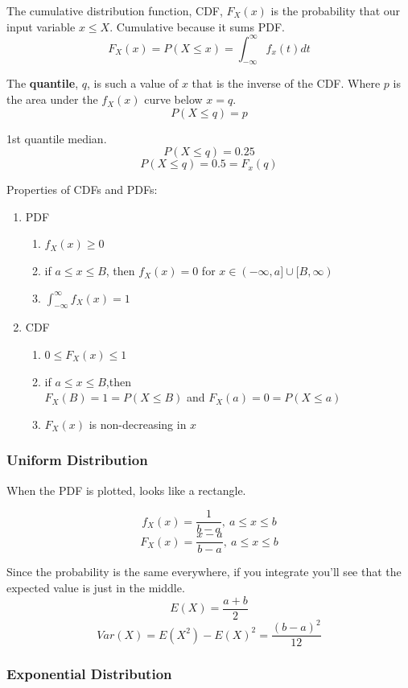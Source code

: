 \documentclass{report}
\begin{document}
The cumulative distribution function, CDF, $F_X(x)$ is the probability that our input variable $x \leq X$. Cumulative because it sums PDF. $$F_X(x) = P(X \leq x) = \int_{-\infty}^{\infty} f_x(t) dt$$

The \textbf{quantile}, $q$, is such a value of $x$ that is the inverse of the CDF. Where $p$ is the area under the $f_X(x)$ curve below $x=q$. $$P(X \leq q) = p$$

1st quantile median. $$P(X \leq q) = 0.25$$ $$P(X \leq q) = 0.5 = F_x(q)$$

Properties of CDFs and PDFs:

\begin{enumerate}
\item PDF \begin{enumerate}
\item $f_X(x) \geq 0$
\item if $a \leq x \leq B$, then $f_X(x) = 0$ for $x \in (-\infty, a] \cup [B, \infty)$
\item $\int_{-\infty}^{\infty} f_X(x) = 1$
\end{enumerate}
\item CDF \begin{enumerate}
\item $ 0 \leq F_X(x) \leq 1 $
\item if $a \leq x \leq B$,then \\ $F_X(B) = 1 = P(X \leq B)$ and $F_X(a) = 0 = P(X \leq a)$
\item $F_X(x)$ is non-decreasing in $x$
\end{enumerate}
\end{enumerate}

\subsubsection{Uniform Distribution}

When the PDF is plotted, looks like a rectangle.

$$ f_X(x) = \frac{1}{b-a},\ a \leq x \leq b $$
$$ F_X(x) = \frac{x-a}{b-a},\ a \leq x \leq b$$

Since the probability is the same everywhere, if you integrate you'll see that the expected value is just in the middle.
$$E(X) = \frac{a+b}{2}$$
$$Var(X) = E(X^2) - E(X)^2 = \frac{(b-a)^2}{12}$$

\subsubsection{Exponential Distribution}
\end{document}
